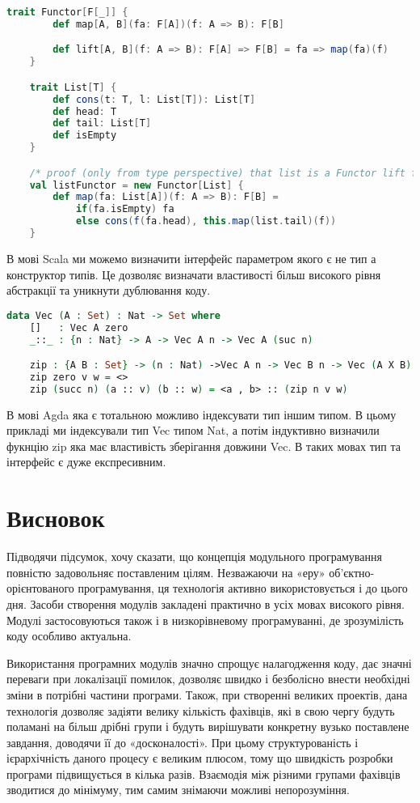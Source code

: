 \documentclass[a4paper,14pt, titlepage]{article}
\begin{document}
\begin{lstlisting}[language = Scala , firstnumber = last, caption={інтерфейси на мові Scala}]
    trait Functor[F[_]] {
        def map[A, B](fa: F[A])(f: A => B): F[B]

        def lift[A, B](f: A => B): F[A] => F[B] = fa => map(fa)(f)
    }

    trait List[T] {
        def cons(t: T, l: List[T]): List[T]
        def head: T
        def tail: List[T]
        def isEmpty
    }

    /* proof (only from type perspective) that list is a Functor lift function is derived automatically */
    val listFunctor = new Functor[List] {
        def map(fa: List[A])(f: A => B): F[B] =
            if(fa.isEmpty) fa
            else cons(f(fa.head), this.map(list.tail)(f))
    }
\end{lstlisting}

В мові Scala ми можемо визначити інтерфейс параметром якого є не тип а конструктор типів.
Це дозволяє визначати властивості більш високого рівня абстракції та уникнути дублювання коду.

\begin{lstlisting}[language = Agda, caption={інтерфейс на мові Agda}]
    data Vec (A : Set) : Nat -> Set where
    []   : Vec A zero
    _::_ : {n : Nat} -> A -> Vec A n -> Vec A (suc n)

    zip : {A B : Set} -> (n : Nat) ->Vec A n -> Vec B n -> Vec (A X B) n
    zip zero v w = <>
    zip (succ n) (a :: v) (b :: w) = <a , b> :: (zip n v w)
\end{lstlisting}
В мові Agda яка є тотальною можливо індексувати тип іншим типом. В цьому
прикладі ми індексували тип Vec типом Nat, а потім індуктивно визначили фукнцію zip
яка має властивість зберігання довжини Vec. В таких мовах тип та інтерфейс є дуже
експресивним.

\section{Висновок}
Підводячи підсумок, хочу сказати, що концепція модульного програмування
повністю задовольняє поставленим цілям. Незважаючи на «еру»
об'єктно-орієнтованого програмування, ця технологія активно
використовується і до цього дня. Засоби створення модулів закладені
практично в усіх мовах високого рівня. Модулі застосовуються також і в
низкорівневому програмуванні, де зрозумілість коду особливо актуальна.

Використання програмних модулів значно спрощує налагодження коду, дає
значні переваги при локалізації помилок, дозволяє швидко і безболісно
внести необхідні зміни в потрібні частини програми. Також, при створенні
великих проектів, дана технологія дозволяє задіяти велику кількість
фахівців, які в свою чергу будуть поламані на більш дрібні групи і
будуть вирішувати конкретну вузько поставлене завдання, доводячи її до
«досконалості». При цьому структурованість і ієрархічність даного
процесу є великим плюсом, тому що швидкість розробки програми
підвищується в кілька разів. Взаємодія між різними групами фахівців
зводитися до мінімуму, тим самим знімаючи можливі непорозуміння.
\end{document}
